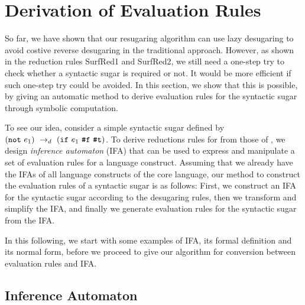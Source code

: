 \section{Derivation of Evaluation Rules}
\label{sec:ruleDerivation}

So far, we have shown that our resugaring algorithm can use lazy desugaring to avoid costive reverse desugaring in the traditional approach. However, as shown in the reduction rules {\sc SurfRed1} and {\sc SurfRed2}, we still need a one-step try to check whether a syntactic sugar is required or not. It would be more efficient if such one-step try could be avoided. In this section, we show that this is possible, by giving an automatic method to derive evaluation rules for the syntactic sugar through symbolic computation.


To see our idea, consider a simple syntactic sugar defined by $(\mbox{\tt not}~e_1) ~\rightarrow_d~ (\mbox{\tt if}~e_1~\mbox{\tt \#f}~\mbox{\tt \#t})$. To derive reductions rules for  from those of , we design \textit{inference automaton} (IFA) that can be used to express and manipulate a set of evaluation rules for a language construct.
%
Assuming that we already have the IFAs of all language constructs of the core language, our method to construct the evaluation rules of a syntactic sugar is as follows: First, we construct an IFA for the syntactic sugar according to the desugaring rules, then we transform and simplify the IFA, and finally we generate evaluation rules for the syntactic sugar from the IFA.

In this following, we start with some examples of IFA, its formal definition and its normal form, before we proceed to give our algorithm for conversion between evaluation rules and IFA.

\subsection{Inference Automaton}

